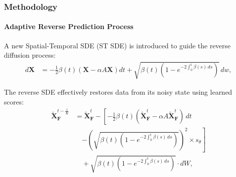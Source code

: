 \documentclass[light]{lutbeamer} %
\begin{document}
\begin{frame}
    \frametitle{Methodology}
    \framesubtitle{Adaptive Reverse Prediction Process}
    A new Spatial-Temporal SDE (ST SDE) is introduced to guide the reverse diffusion process:
    \begin{equation}
        \begin{aligned}
            d\mathbf{X} & = -\frac{1}{2} \beta(t)\left( \mathbf{X} - \alpha A \mathbf{X} \right)dt + \sqrt{\beta(t)(1 - e^{-2 \int_0^t \beta(s) \, ds})} \, dw,
        \end{aligned}
        \label{eq:spatiotemporal_sde}
    \end{equation}

    The reverse SDE effectively restores data from its noisy state using learned scores:
    \vspace{-0.4em}
    \begin{equation}
        \begin{aligned}
            \tilde{\mathbf{X}}_{\mathbf{F}}^{t - \frac{1}{K}} & = \tilde{\mathbf{X}}_{\mathbf{F}}^{t} - \left[ -\frac{1}{2} \beta(t) \left( \tilde{\mathbf{X}}_{\mathbf{F}}^{t} - \alpha A \tilde{\mathbf{X}}_{\mathbf{F}}^{t} \right) \, dt \right. \\
                                                              & \quad \left. - \left(\sqrt{\beta(t)(1 - e^{-2 \int_0^{t} \beta(s) \, ds})} \right)^2 \times s_\theta \right]                                                                         \\
                                                              & \quad + \sqrt{\beta(t)(1 - e^{-2 \int_0^{t} \beta(s) \, ds})} \cdot dW,
        \end{aligned}
        \label{eq:reverse_stdse}
    \end{equation}

\end{frame}
\end{document}
